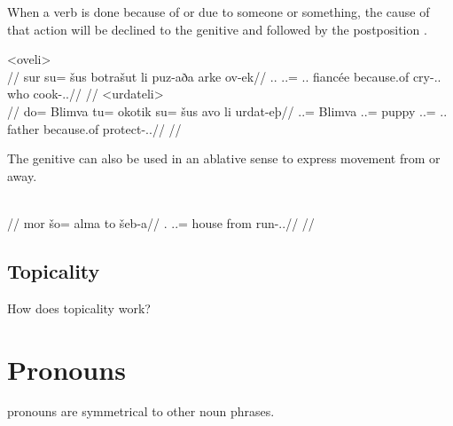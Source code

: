 When a verb is done because of or due to someone or something, the cause of that action will be declined to the genitive and followed by the postposition   .

	\a<oveli>\begingl
		\glpreamble{}\\
		//
		\gla sur su= šus botrašut li puz-aða arke ov-ek//
		\glb \Tps.\An.\Abs{} \An.\Sg.\Gen= \Tps.\An.\Gen{} fiancée because.of cry-\Ind.\Pst.\Prg{} who cook-\Ind.\Pst.\Pfv//
		\glft{}//
	\endgl
	\a<urdateli>\begingl
		\glpreamble{}\\
		//
		\gla do= Blimva tu= okotik su= šus avo li urdat-eþ//
		\glb \An.\Sg.\Erg= Blimva \An.\Sg.\Acc= puppy \An.\Sg.\Gen= \Tps.\An.\Gen{} father because.of protect-\Ind.\Npst.\Prg//
		\glft{}//
	\endgl
\xe

The genitive can also be used in an ablative sense to express movement from or away.

	\begingl
		\glpreamble{}\\
		//
		\gla mor šo= alma to šeb-a//
		\glb \Fps.\An{} \In.\Sg.\Gen= house from run-\Ind.\Npst.\Ipfv//
		\glft{}//
	\endgl
\xe

\subsection{Topicality}
\label{subsec:tvk-nouns-topicality}

How does topicality work?

\section{Pronouns}
\label{sec:tvk-pronouns}

\langtvk{} pronouns are symmetrical to other noun phrases\autocite{wals-50}.
